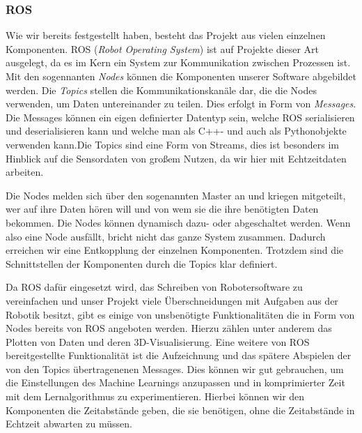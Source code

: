 \subsubsection{ROS}

Wie wir bereits festgestellt haben, besteht das Projekt aus vielen einzelnen Komponenten. ROS (\emph{Robot Operating System}) ist auf Projekte dieser Art ausgelegt, da es im Kern ein System zur Kommunikation zwischen Prozessen ist. Mit den sogennanten \emph{Nodes} können die Komponenten unserer Software abgebildet werden. Die \emph{Topics} stellen die Kommunikationskanäle dar, die die Nodes verwenden, um Daten untereinander zu teilen. Dies erfolgt in Form von \emph{Messages}. Die Messages können ein eigen definierter Datentyp sein, welche ROS serialisieren und deserialisieren kann und welche man als C++- und auch als Pythonobjekte verwenden kann.Die Topics sind eine Form von Streams, dies ist besonders im Hinblick auf die Sensordaten von großem Nutzen, da wir hier mit Echtzeitdaten arbeiten.

Die Nodes melden sich über den sogenannten Master an und kriegen mitgeteilt, wer auf ihre Daten hören will und von wem sie die ihre benötigten Daten bekommen. Die Nodes können dynamisch dazu- oder abgeschaltet werden. Wenn also eine Node ausfällt, bricht nicht das ganze System zusammen. Dadurch erreichen wir eine Entkopplung der einzelnen Komponenten. Trotzdem sind die Schnittstellen der Komponenten durch die Topics klar definiert.

Da ROS dafür eingesetzt wird, das Schreiben von Robotersoftware zu vereinfachen\cite{web:ros} und unser Projekt viele Überschneidungen mit Aufgaben aus der Robotik besitzt, gibt es einige von unsbenötigte Funktionalitäten die in Form von Nodes bereits von ROS angeboten werden. Hierzu zählen unter anderem das Plotten von Daten und deren 3D-Visualisierung. Eine weitere von ROS bereitgestellte Funktionalität ist die Aufzeichnung und das spätere Abspielen der von den Topics übertragenenen Messages. Dies können wir gut gebrauchen, um die Einstellungen des Machine Learnings anzupassen und in komprimierter Zeit mit dem Lernalgorithmus zu experimentieren. Hierbei können wir den Komponenten die Zeitabstände geben, die sie benötigen, ohne die Zeitabstände in Echtzeit abwarten zu müssen.


